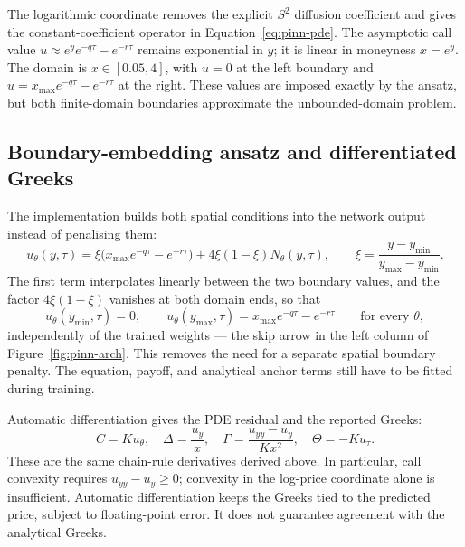 \documentclass[11pt,a4paper]{article}
\begin{document}
The logarithmic coordinate removes the explicit $S^2$ diffusion coefficient and gives the constant-coefficient operator in Equation~\eqref{eq:pinn-pde}. The asymptotic call value $u\approx e^y e^{-q\tau}-e^{-r\tau}$ remains exponential in $y$; it is linear in moneyness $x=e^y$. The domain is $x\in[0.05,4]$, with $u=0$ at the left boundary and $u=x_{\max}e^{-q\tau}-e^{-r\tau}$ at the right. These values are imposed exactly by the ansatz, but both finite-domain boundaries approximate the unbounded-domain problem.

\subsection{Boundary-embedding ansatz and differentiated Greeks}
\label{sec:pinn-ansatz-sec}

The implementation builds both spatial conditions into the network output instead of penalising them:
\begin{equation}
u_\theta(y,\tau)=\xi\bigl(x_{\max}e^{-q\tau}-e^{-r\tau}\bigr)
 +4\xi(1-\xi)N_\theta(y,\tau),\qquad
\xi=\frac{y-y_{\min}}{y_{\max}-y_{\min}}. \label{eq:pinn-ansatz}
\end{equation}
The first term interpolates linearly between the two boundary values, and the factor $4\xi(1-\xi)$ vanishes at both domain ends, so that
\begin{equation}
u_\theta(y_{\min},\tau)=0,\qquad
u_\theta(y_{\max},\tau)=x_{\max}e^{-q\tau}-e^{-r\tau}\qquad\text{for every }\theta,
\label{eq:pinn-bc-exact}
\end{equation}
independently of the trained weights --- the skip arrow in the left column of Figure~\ref{fig:pinn-arch}. This removes the need for a separate spatial boundary penalty. The equation, payoff, and analytical anchor terms still have to be fitted during training.

Automatic differentiation gives the PDE residual and the reported Greeks:
\begin{equation}
C=Ku_\theta,\quad \Delta=\frac{u_y}{x},\quad
\Gamma=\frac{u_{yy}-u_y}{Kx^2},\quad \Theta=-Ku_\tau . \label{eq:pinn-greeks}
\end{equation}
These are the same chain-rule derivatives derived above. In particular, call convexity requires $u_{yy}-u_y\geq0$; convexity in the log-price coordinate alone is insufficient. Automatic differentiation keeps the Greeks tied to the predicted price, subject to floating-point error. It does not guarantee agreement with the analytical Greeks.
\end{document}
